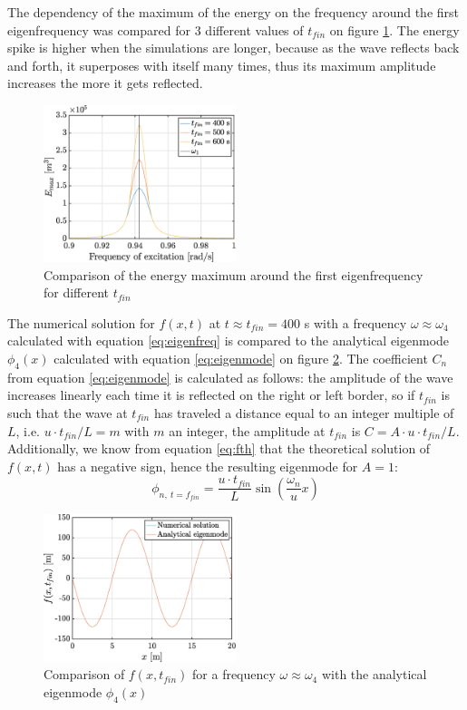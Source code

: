 \documentclass[a4paper,12pt,twoside]{article}
\begin{document}
    The dependency of the maximum of the energy on the frequency around the first eigenfrequency was compared for 3 different values of $t_{fin}$ on figure \ref{fig:Eomcomp}. The energy spike is higher when the simulations are longer, because as the wave reflects back and forth, it superposes with itself many times, thus its maximum amplitude increases the more it gets reflected.

    \begin{figure}[h!]
     \centering
     \includegraphics[width=0.5\textwidth]{graphs/Eomcomp.eps}
     \caption{Comparison of the energy maximum around the first eigenfrequency for different $t_{fin}$}
     \label{fig:Eomcomp}
    \end{figure}

    The numerical solution for $f(x,t)$ at $t\approx t_{fin} = 400$ s with a frequency $\omega\approx \omega_4$ calculated with equation \eqref{eq:eigenfreq} is compared to the analytical eigenmode $\phi_4(x)$ calculated with equation \eqref{eq:eigenmode} on figure \ref{fig:eigenmode}. The coefficient $C_n$ from equation \eqref{eq:eigenmode} is calculated as follows: the amplitude of the wave increases linearly each time it is reflected on the right or left border, so if $t_{fin}$ is such that the wave at $t_{fin}$ has traveled a distance equal to an integer multiple of $L$, i.e. $u\cdot t_{fin}/L=m$ with $m$ an integer, the amplitude at $t_{fin}$ is $C=A\cdot u\cdot t_{fin}/L$. Additionally, we know from equation \eqref{eq:fth} that the theoretical solution of $f(x,t)$ has a negative sign, hence the resulting eigenmode for $A=1$:
    \begin{equation*}
     \phi_{n,~t=f_{fin}}=\frac{u\cdot t_{fin}}{L} \sin\left(\frac{\omega_n}{u}x\right)
    \end{equation*}


    \begin{figure}[h!]
     \centering
     \includegraphics[width=0.5\textwidth]{graphs/eigenmode.eps}
     \caption{Comparison of $f(x,t_{fin})$ for a frequency $\omega\approx \omega_4$ with the analytical eigenmode $\phi_4(x)$}
     \label{fig:eigenmode}
    \end{figure}
\end{document}
